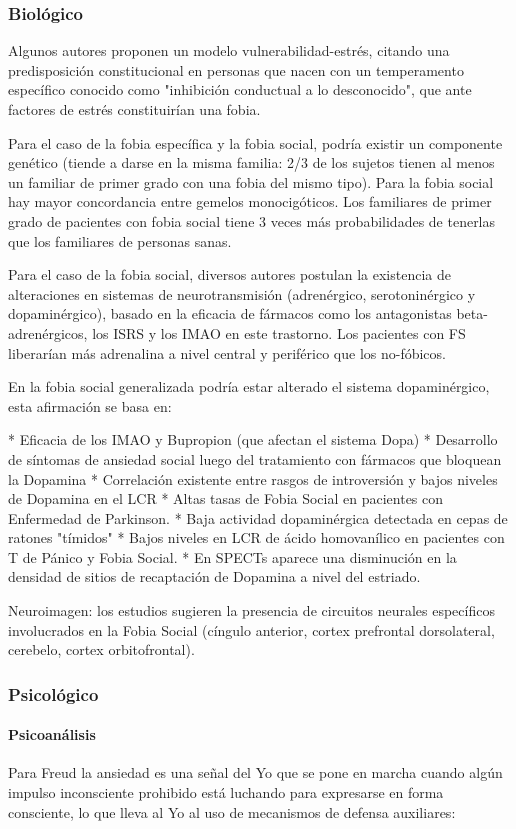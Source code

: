 \subsubsection*{Biológico}
Algunos autores proponen un modelo vulnerabilidad-estrés, citando una predisposición constitucional en personas que nacen con un temperamento específico conocido como "inhibición conductual a lo desconocido", que ante factores de estrés constituirían una fobia.

Para el caso de la fobia específica y la fobia social, podría existir un componente genético (tiende a darse en la misma familia: 2/3 de los sujetos tienen al menos un familiar de primer grado con una fobia del mismo tipo). Para la fobia social hay mayor concordancia entre gemelos monocigóticos. Los familiares de primer grado de pacientes con fobia social tiene 3 veces más probabilidades de tenerlas que los familiares de personas sanas.

Para el caso de la fobia social, diversos autores postulan la existencia de alteraciones en sistemas de neurotransmisión (adrenérgico, serotoninérgico y dopaminérgico), basado en la eficacia de fármacos como los antagonistas beta-adrenérgicos, los ISRS y los IMAO en este trastorno. Los pacientes con FS liberarían más adrenalina a nivel central y periférico que los no-fóbicos.

En la fobia social generalizada podría estar alterado el sistema dopaminérgico, esta afirmación se basa en:

* Eficacia de los IMAO y Bupropion (que afectan el sistema Dopa)
* Desarrollo de síntomas de ansiedad social luego del tratamiento con fármacos que bloquean la Dopamina
* Correlación existente entre rasgos de introversión y bajos niveles de Dopamina en el LCR
* Altas tasas de Fobia Social en pacientes con Enfermedad de Parkinson.
* Baja actividad dopaminérgica detectada en cepas de ratones "tímidos"
* Bajos niveles en LCR de ácido homovanílico en pacientes con T de Pánico y Fobia Social.
* En SPECTs aparece una disminución en la densidad de sitios de recaptación de Dopamina a nivel del estriado.

Neuroimagen: los estudios sugieren la presencia de circuitos neurales específicos involucrados en la Fobia Social (cíngulo anterior, cortex prefrontal dorsolateral, cerebelo, cortex orbitofrontal).
\subsubsection*{Psicológico}
\paragraph{Psicoanálisis}
Para Freud la ansiedad es una señal del Yo que se pone en marcha cuando algún impulso inconsciente prohibido está luchando para expresarse en forma consciente, lo que lleva al Yo al uso de mecanismos de defensa auxiliares:

